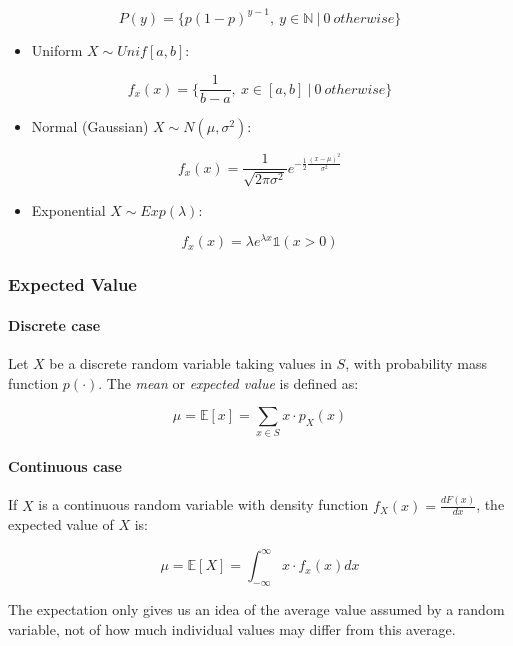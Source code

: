 \documentclass{article}
\begin{document}
\[P(y)=\{ p(1-p)^{y-1},\ y\in \mathbb{N}\ |\ 0\ otherwise \}\]

\begin{itemize}
\tightlist
\item
  Uniform \(X\sim Unif[a, b]\):
\end{itemize}

\[f_x(x)=\{ \frac{1}{b-a},\ x\in [a, b]\ |\ 0\ otherwise \}\]

\begin{itemize}
\tightlist
\item
  Normal (Gaussian) \(X\sim N(\mu , \sigma^2)\):
\end{itemize}

\[f_x(x) = \frac{1}{\sqrt{2\pi \sigma^2}}e^{-\frac{1}{2}\frac{(x-\mu)^2}{\sigma^2}}\]

\begin{itemize}
\tightlist
\item
  Exponential \(X\sim Exp(\lambda)\):
\end{itemize}

\[f_x(x)=\lambda e^{\lambda x}\mathbb{1}(x>0)\]

\subsubsection{Expected Value}\label{expected-value}

\paragraph{Discrete case}\label{discrete-case}

Let \(X\) be a discrete random variable taking values in \(S\), with
probability mass function \(p(\cdot)\). The \emph{mean} or
\emph{expected value} is defined as:

\[\mu = \mathbb{E}[x] = \sum_{x\in S} x\cdot p_X(x)\]

\paragraph{Continuous case}\label{continuous-case}

If \(X\) is a continuous random variable with density function
\(f_X(x) =
\frac{dF(x)}{dx}\), the expected value of \(X\) is:

\[\mu = \mathbb{E}[X] = \int_{-\infty}^{\infty} x\cdot f_x(x) dx \]

The expectation only gives us an idea of the average value assumed by a
random variable, not of how much individual values may differ from this
average.
\end{document}
